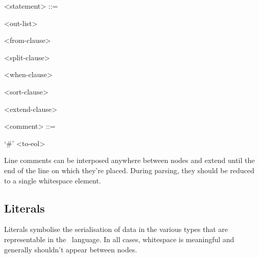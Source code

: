 \begin{grammar}
  <statement> ::= \begin{syntdiag}
    <out-list>
    \begin{stack}
      <from-clause> \\
    \end{stack}
    \begin{stack}
      <split-clause> \\
    \end{stack}
    \begin{stack}
      <when-clause> \\
    \end{stack}
    \begin{stack}
      <sort-clause> \\
    \end{stack}
    \begin{stack}
      <extend-clause> \\
    \end{stack}
  \end{syntdiag}

  <comment> ::= \begin{syntdiag}
    `#'
    <to-eol>
  \end{syntdiag}
\end{grammar}

Line comments can be interposed anywhere between nodes and extend until
the end of the line on which they're placed. During parsing, they should
be reduced to a single whitespace element.

\subsection{Literals}

Literals symbolise the serialisation of data in the various types that
are representable in the \stag\ language. In all cases, whitespace is
meaningful and generally shouldn't appear between nodes.

